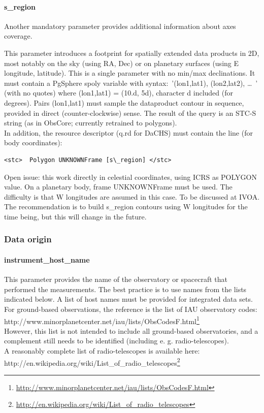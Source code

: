 \documentclass[11pt,a4paper]{ivoa}
\begin{document}
\paragraph{s\_region}

Another mandatory parameter provides additional information about axes coverage.

This parameter introduces a footprint for spatially extended data products in 2D, most notably on the sky (using RA, Dec) or on planetary surfaces (using E longitude, latitude). This is a single parameter with no min/max declinations. It must contain a PgSphere spoly variable with syntax: '{(lon1,lat1), (lon2,lat2), … }' (with no quotes) where (lon1,lat1) = (10.d, 5d), character d included (for degrees). Pairs (lon1,lat1) must sample the dataproduct contour in sequence, provided in direct (counter-clockwise) sense. The result of the query is an STC-S string (as in ObsCore; currently retrained to polygons).\\

In addition, the resource descriptor (q.rd for DaCHS) must contain the line (for body coordinates):






\begin{verbatim}<stc>  Polygon UNKNOWNFrame [s\_region] </stc>\end{verbatim}




Open issue: this work directly in celestial coordinates, using ICRS as POLYGON value. On a planetary body, frame UNKNOWNFrame must be used. The difficulty is that W longitudes are assumed in this case. To be discussed at IVOA. The recommendation is to build s\_region contours using W longitudes for the time being, but this will change in the future.

\subsubsection{Data origin}

\paragraph{instrument\_host\_name}

This parameter provides the name of the observatory or spacecraft that performed the measurements. The best practice is to use names from the lists indicated below. A list of host names must be provided for integrated data sets. \\ For ground-based observations, the reference is the list of IAU observatory codes: http://www.minorplanetcenter.net/iau/lists/ObsCodesF.html\footnote{\url{http://www.minorplanetcenter.net/iau/lists/ObsCodesF.html}}\\ However, this list is not intended to include all ground-based observatories, and a complement still needs to be identified (including e. g. radio-telescopes).\\ A reasonably complete list of radio-telescopes is available here: \\ http://en.wikipedia.org/wiki/List\_of\_radio\_telescopes\footnote{\url{http://en.wikipedia.org/wiki/List\_of\_radio\_telescopes}}
\end{document}
